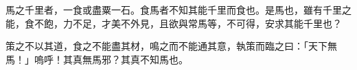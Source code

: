 馬之千里者，一食或盡粟一石。食馬者不知其能千里而食也。是馬也，雖有千里之能，食不飽，力不足，才美不外見，且欲與常馬等，不可得，安求其能千里也？

策之不以其道，食之不能盡其材，鳴之而不能通其意，執策而臨之曰：「天下無馬！」嗚呼！其真無馬邪？其真不知馬也。

